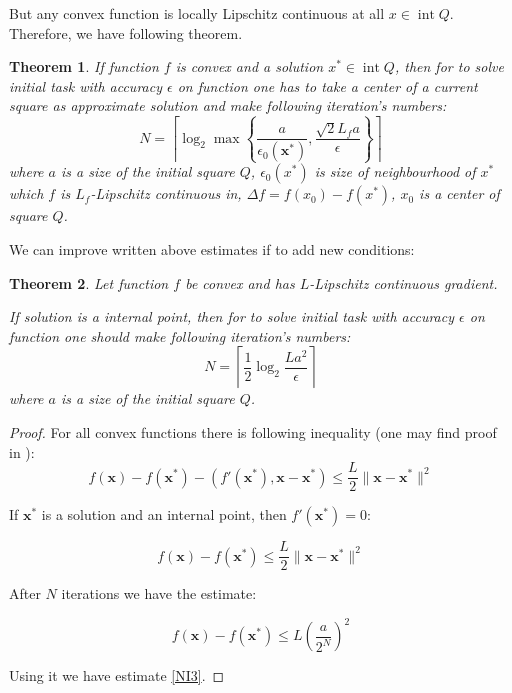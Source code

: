 \documentclass[12pt]{article}
\newtheorem{theorem}{Theorem}[section]
\DeclareMathOperator{\intt}{int}
\begin{document}
But any convex function is locally Lipschitz continuous at all $x \in \intt Q$. Therefore, we have following theorem.

\begin{theorem}
If function $f$ is convex and a solution $x^*\in \intt Q$, then for to solve initial task with accuracy $\epsilon$ on function one has to take a center of a current square as approximate  solution and make following iteration's numbers:
\begin{equation}\label{NI2}
N = \left\lceil\log_2\max\left\{\frac{a}{\epsilon_0(\textbf{x}^*)},\frac{\sqrt{2}L_fa}{\epsilon}\right\}\right\rceil
\end{equation}
where $a$ is a size of the initial square $Q$, $\epsilon_0(x^*)$ is size of neighbourhood of $x^*$ which $f$ is $L_f$-Lipschitz continuous in, $\Delta f =  f(x_0) - f(x^*)$, $x_0$ is a center of square $Q$.
\end{theorem}

We can improve written above estimates if to add new conditions:

\begin{theorem}
Let function $f$ be convex and has $L$-Lipschitz continuous gradient.

If solution is a internal point, then for to solve initial task with accuracy $\epsilon$ on function one should make following iteration's numbers:
\begin{equation}\label{NI3}N = \left\lceil\frac{1}{2}\log_2\frac{La^2}{\epsilon}\right\rceil\end{equation}
where $a$ is a size of the initial square $Q$.
\end{theorem}

\begin{proof}
For all convex functions there is following inequality (one may find proof in \cite{Nesterov}):
$$f(\textbf{x}) - f(\textbf{x}^*) - (f'(\textbf{x}^*), \textbf{x} - \textbf{x}^*) \leq \frac{L}{2}\|\textbf{x}-\textbf{x}^*\|^2$$

If $\textbf{x}^*$ is a solution and an internal point, then $f'(\textbf{x}^*) = 0$:

$$f(\textbf{x}) - f(\textbf{x}^*)\leq \frac{L}{2}\|\textbf{x}-\textbf{x}^*\|^2$$

After $N$ iterations we have the estimate:

$$f(\textbf{x}) - f(\textbf{x}^*)\leq L\left(\frac{a}{2^N}\right)^2$$

Using it we have estimate \eqref{NI3}.
\end{proof}
\end{document}
